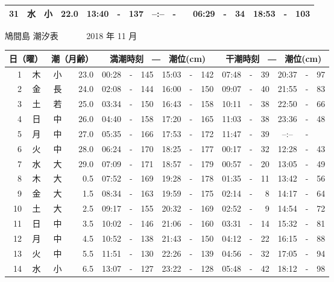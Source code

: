\documentclass[12pt.a4j]{jsarticle}
\begin{document}
\begin{center}
\begin{table}[ht]
\begin{tabular}{|rc|cr|ccrccr|ccrccr|}
31 & 水 & 小 & 22.0 &  13:40 &-& 137  &  --:-- &-&     &   06:29 &-&  34  &   18:53 &-& 103  \\
   \hline
   \end{tabular}
\end{table}
\newpage
 {\LARGE 鳩間島  潮汐表　　　}
 {\large 2018 年 11 月}\\
 \begin{table}[ht]
    \begin{tabular}{|rc|cr|ccrccr|ccrccr|}
    \hline
    \multicolumn{2}{|c|}{日（曜）} & \multicolumn{2}{c|}{潮（月齢）} & \multicolumn{6}{c|}{満潮時刻　―　潮位(cm)} & \multicolumn{6}{c|}{干潮時刻　―　潮位(cm)} \\
 \hline
 1 & 木 & 小 & 23.0 &  00:28 &-& 145  &  15:03 &-& 142  &   07:48 &-&  39  &   20:37 &-&  97  \\
 2 & 金 & 長 & 24.0 &  02:08 &-& 144  &  16:00 &-& 150  &   09:07 &-&  40  &   21:55 &-&  83  \\
 3 & 土 & 若 & 25.0 &  03:34 &-& 150  &  16:43 &-& 158  &   10:11 &-&  38  &   22:50 &-&  66  \\
 4 & 日 & 中 & 26.0 &  04:40 &-& 158  &  17:20 &-& 165  &   11:03 &-&  38  &   23:36 &-&  48  \\
 5 & 月 & 中 & 27.0 &  05:35 &-& 166  &  17:53 &-& 172  &   11:47 &-&  39  &   --:-- &-&     \\
 6 & 火 & 中 & 28.0 &  06:24 &-& 170  &  18:25 &-& 177  &   00:17 &-&  32  &   12:28 &-&  43  \\
 7 & 水 & 大 & 29.0 &  07:09 &-& 171  &  18:57 &-& 179  &   00:57 &-&  20  &   13:05 &-&  49  \\
 8 & 木 & 大 &  0.5 &  07:52 &-& 169  &  19:28 &-& 178  &   01:35 &-&  11  &   13:42 &-&  56  \\
 9 & 金 & 大 &  1.5 &  08:34 &-& 163  &  19:59 &-& 175  &   02:14 &-&   8  &   14:17 &-&  64  \\
10 & 土 & 大 &  2.5 &  09:17 &-& 155  &  20:32 &-& 169  &   02:52 &-&   9  &   14:54 &-&  72  \\
11 & 日 & 中 &  3.5 &  10:02 &-& 146  &  21:06 &-& 160  &   03:31 &-&  14  &   15:32 &-&  81  \\
12 & 月 & 中 &  4.5 &  10:52 &-& 138  &  21:43 &-& 150  &   04:12 &-&  22  &   16:15 &-&  88  \\
13 & 火 & 中 &  5.5 &  11:51 &-& 130  &  22:26 &-& 139  &   04:56 &-&  32  &   17:05 &-&  94  \\
14 & 水 & 小 &  6.5 &  13:07 &-& 127  &  23:22 &-& 128  &   05:48 &-&  42  &   18:12 &-&  98  \\

\end{tabular}
\end{table}
\end{center}
\end{document}
